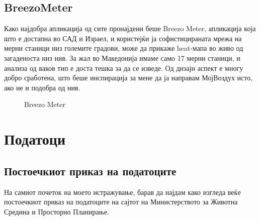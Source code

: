 \documentclass{uvamscse}
\begin{document}
\section{BreezoMeter}
Како најдобра апликација од сите пронајдени беше Breezo Meter, апликација која што е достапна во САД и Израел, и користејќи ја софистицираната мрежа на мерни станици низ големите градови, може да прикаже heat-мапа во живо од загаденоста низ нив. За жал во Македонија имаме само 17 мерни станици, и анализа од ваков тип е доста тешка за да се изведе. Од дизајн аспект е многу добро сработена, што беше инспирација за мене да ја направам МојВоздух исто, ако не и подобра од нив.
\begin{figure}[H]
\centering
  \caption{Breezo Meter}
  \label{fig:breezo}
\end{figure}

\chapter{Податоци}
\section{Постоечкиот приказ на податоците}

На самиот почеток на моето истражување, барав да најдам како изгледа веќе постоечкиот приказ на податоците на сајтот на Министерството за Животна Средина и Просторно Планирање. 
\end{document}
